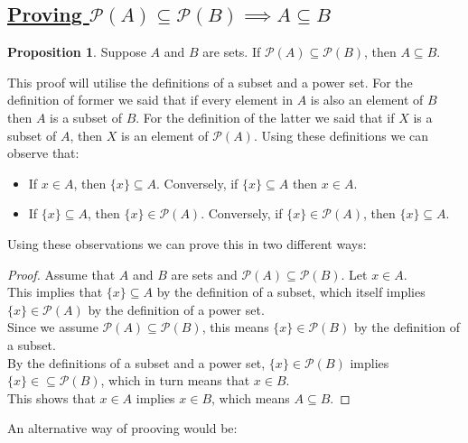 \documentclass{amsart} %
\theoremstyle{definition} %
\theoremstyle{proposition} %
\newtheorem*{prpn}{Proposition}
\theoremstyle{remark} %
\begin{document}
\bigskip \bigskip

\subsection{\underline{Proving $ \mathcal{P}(A) \subseteq \mathcal{P}(B) \implies A \subseteq B$}}

\begin{prpn}
      Suppose $A$ and $B$ are sets. If $\mathcal{P}(A) \subseteq \mathcal{P}(B)$, then $A \subseteq B$.
\end{prpn}

This proof will utilise the definitions of a subset and a power set. For the definition of former we said that if every element in $A$ is also an element of $B$ then $A$ is a subset of $B$. For the definition of the latter we said that if $X$ is a subset of $A$, then $X$ is an element of $\mathcal{P}(A)$. Using these definitions we can observe that:
\begin{itemize}
      \item If $x \in A$, then $\{x\} \subseteq A$. Conversely, if $\{x\} \subseteq A$ then $x \in A$.
      \item If $\{x\} \subseteq A$, then $\{x\} \in \mathcal{P}(A)$. Conversely, if $\{x\} \in \mathcal{P}(A)$, then $\{x\} \subseteq A$.
\end{itemize}

Using these observations we can prove this in two different ways:

\begin{proof}
      \indent Assume that $A$ and $B$ are sets and $\mathcal{P}(A) \subseteq \mathcal{P}(B)$. Let $x \in A$. \\
      \indent This implies that $\{x\} \subseteq A$ by the definition of a subset, which itself implies $\{x\} \in \mathcal{P}(A)$ by the definition of a power set. \\
      \indent Since we assume $\mathcal{P}(A) \subseteq \mathcal{P}(B)$, this means $\{x\} \in \mathcal{P}(B)$ by the definition of a subset. \\
      \indent By the definitions of a subset and a power set, $\{x\} \in \mathcal{P}(B)$ implies $\{x\} \in \subseteq \mathcal{P}(B)$, which in turn means that $x \in B$. \\
      \indent This shows that $x \in A$ implies $x \in B$, which means $A \subseteq B$.
\end{proof}

\noindent An alternative way of prooving would be:
\end{document}
